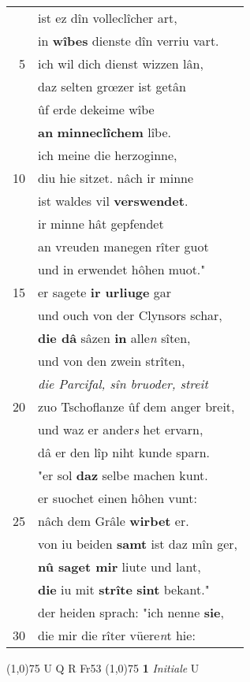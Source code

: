 \documentclass[8pt,a4paper,notitlepage]{article}
\begin{document}
\begin{table}[ht]
\begin{minipage}[t]{0.5\linewidth}
\begin{tabular}{rl}
 & ist ez dîn volleclîcher art,\\ 
 & in \textbf{wîbes} dienste dîn verriu vart.\\ 
5 & ich wil dich dienst wizzen lân,\\ 
 & daz selten grœzer ist getân\\ 
 & ûf erde dekeime wîbe\\ 
 & \textbf{an} \textbf{minneclîchem} lîbe.\\ 
 & ich meine die herzoginne,\\ 
10 & diu hie sitzet. nâch ir minne\\ 
 & ist waldes vil \textbf{verswendet}.\\ 
 & ir minne hât gepfendet\\ 
 & an vreuden manegen rîter guot\\ 
 & und in erwendet hôhen muot."\\ 
15 & er sagete \textbf{ir urliuge} gar\\ 
 & und ouch von der Clynsors schar,\\ 
 & \textbf{die dâ} sâzen \textbf{in} alle\textit{n} sîten,\\ 
 & und von den zwein strîten,\\ 
 & \textit{die Parcifal, sîn bruoder, streit}\\ 
20 & zuo Tschoflanze ûf dem anger breit,\\ 
 & und waz er ander\textit{s} het ervarn,\\ 
 & dâ er den lîp niht kunde sparn.\\ 
 & "er sol \textbf{daz} selbe machen kunt.\\ 
 & er suochet einen hôhen vunt:\\ 
25 & nâch dem Grâle \textbf{wirbet} er.\\ 
 & von iu beiden \textbf{samt} ist daz mîn ger,\\ 
 & \textbf{nû saget mir} liute und lant,\\ 
 & \textbf{die} iu mit \textbf{strîte} \textbf{sint} bekant."\\ 
 & der heiden sprach: "ich nenne \textbf{sie},\\ 
30 & die mir die rîter vüere\textit{n}t hie:\\ 
\end{tabular}
\scriptsize
\line(1,0){75} \newline
U Q R Fr53 \newline
\line(1,0){75} \newline
\textbf{1} \textit{Initiale} U  \newline

\end{minipage}
\end{table}
\end{document}
